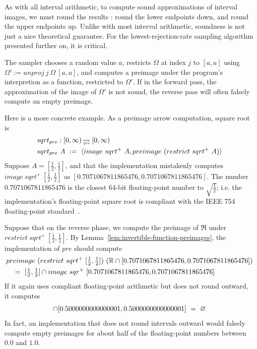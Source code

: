 As with all interval arithmetic, to compute sound approximations of interval images, we must round the results : round the lower endpoints down, and round the upper endpoints up.
Unlike with most interval arithmetic, soundness is not just a nice theoretical guarantee.
For the lowest-rejection-rate sampling algorithm presented further on, it is critical.

The sampler chooses a random value $a$, restricts $\Omega$ at index $j$ to $[a,a]$ using $\Omega' := unproj~j~\Omega~[a,a]$, and computes a preimage under the program's interpretion as a function, restricted to $\Omega'$.
If in the forward pass, the approximation of the image of $\Omega'$ is not sound, the reverse pass will often falsely compute an empty preimage.

Here is a more concrete example.
As a preimage arrow computation, square root is
\begin{equation}
\begin{aligned}
	&sqrt_{pre} : [0,\infty) \operatorname{\rightsquigarrow_{\mspace{-20mu}_\mathrm{pre}}}\,[0,\infty) \\
	&sqrt_{pre}~A\ :=\ \langle{image~sqrt^+~A, preimage~(restrict~sqrt^+~A)}\rangle
\end{aligned}
\end{equation}
Suppose $A = [\frac{1}{2},\frac{1}{2}]$, and that the implementation mistakenly computes $image~sqrt^+~[\frac{1}{2},\frac{1}{2}]$ as $[0.7071067811865476,0.7071067811865476]$.
The number $0.7071067811865476$ is the closest 64-bit floating-point number to $\sqrt{\frac{1}{2}}$; i.e. the implementation's floating-point square root is compliant with the IEEE 754 floating-point standard~\cite{cit:ieee-754-2008}.

Suppose that on the reverse phase, we compute the preimage of $\Re$ under $restrict~sqrt^+~[\frac{1}{2},\frac{1}{2}]$.
By Lemma~\ref{lem:invertible-function-preimages}, the implementation of $pre$ should compute
\begin{equation}
\begin{aligned}
	&preimage~(restrict~sqrt^+~[\tfrac{1}{2},\tfrac{1}{2}])~(\mathbb{R} \cap [0.7071067811865476,0.7071067811865476])
\\
	&\ \ \ =\ [\tfrac{1}{2},\tfrac{1}{2}] \cap image~sqr^+~[0.7071067811865476,0.7071067811865476]
\end{aligned}
\end{equation}
If it again uses compliant floating-point arithmetic but does not round outward, it computes
\begin{equation}
	[\tfrac{1}{2},\tfrac{1}{2}] \i [0.5000000000000001,0.5000000000000001]\ =\ \emptyset
\end{equation}
In fact, an implementation that does not round intervals outward would falsely compute empty preimages for about half of the floating-point numbers between $0.0$ and $1.0$.

